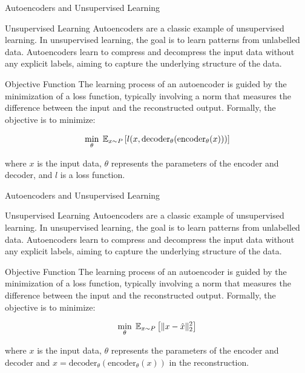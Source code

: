 \begin{frame}{}{Autoencoders and Unsupervised Learning}

    \begin{block}{Unsupervised Learning}
        Autoencoders are a classic example of \alert{unsupervised learning}. In unsupervised learning, the goal is to learn patterns from unlabelled data. Autoencoders learn to compress and decompress the input data without any explicit labels, aiming to capture the underlying structure of the data.
    \end{block}

    \begin{block}{Objective Function}
        The learning process of an autoencoder is guided by the minimization of a loss function, typically involving a norm that measures the difference between the input and the reconstructed output. Formally, the objective is to minimize:

        \[
            \min_{\theta} \; \mathbb{E}_{x \sim P} \left[l(x, \mathrm{decoder}_\theta(\mathrm{encoder}_\theta(x)))\right]
        \]

        where \(x\) is the input data, \(\theta\) represents the parameters of the encoder and decoder, and $l$ is a loss function.
    \end{block}

\end{frame}

\begin{frame}{}{Autoencoders and Unsupervised Learning}

    \begin{block}{Unsupervised Learning}
        Autoencoders are a classic example of \alert{unsupervised learning}. In unsupervised learning, the goal is to learn patterns from unlabelled data. Autoencoders learn to compress and decompress the input data without any explicit labels, aiming to capture the underlying structure of the data.
    \end{block}

    \begin{block}{Objective Function}
        The learning process of an autoencoder is guided by the minimization of a loss function, typically involving a norm that measures the difference between the input and the reconstructed output. Formally, the objective is to minimize:

        \[
            \min_{\theta} \; \mathbb{E}_{x \sim P} \left[\Vert x -  \hat{x} \Vert_2^2\right]
        \]

        where \(x\) is the input data, \(\theta\) represents the parameters of the encoder and decoder and $\hat{x}=\mathrm{decoder}_\theta(\mathrm{encoder}_\theta(x))$ in the reconstruction.
    \end{block}

\end{frame}



